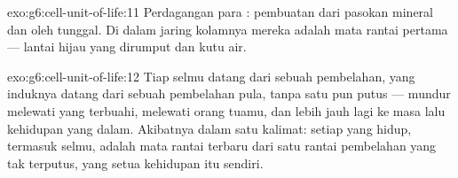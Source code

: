 \begin{solution}{exo:g6:cell-unit-of-life:11}
Perdagangan para : pembuatan  dari pasokan
mineral dan  oleh  tunggal. Di dalam jaring kolamnya mereka
adalah mata rantai pertama --- lantai hijau yang dirumput  dan
kutu air.
\end{solution}

\begin{solution}{exo:g6:cell-unit-of-life:12}
Tiap selmu datang dari sebuah pembelahan, yang  induknya datang
dari sebuah pembelahan pula, tanpa satu pun putus --- mundur melewati
 yang terbuahi, melewati  orang tuamu, dan lebih jauh lagi
ke masa lalu kehidupan yang dalam. Akibatnya dalam satu kalimat:
setiap  yang hidup, termasuk selmu, adalah mata rantai terbaru dari
satu rantai pembelahan yang tak terputus, yang setua kehidupan itu
sendiri.
\end{solution}

